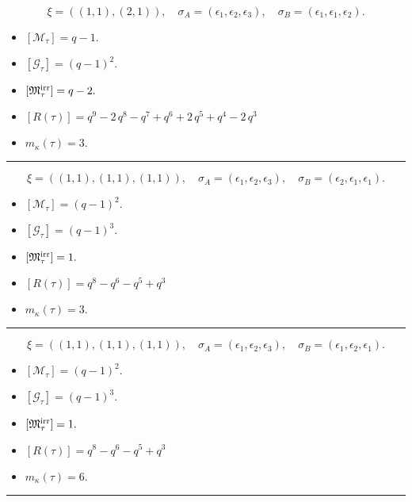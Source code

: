 \documentclass[10pt,a4paper]{amsart}
\begin{document}
$$\xi = ({(1, 1)}, {(2, 1)}),\quad \sigma_A = ({{\epsilon_1}}, {{\epsilon_2, \epsilon_3}}),\quad \sigma_B = ({{\epsilon_1}}, {{\epsilon_1, \epsilon_2}}).$$

\begin{itemize}
 \item $[\mathcal{M}_{\tau}] = q - 1 .$

 \item $[\mathcal{G}_{\tau}] = {\left(q - 1\right)}^{2} .$

 \item $[{\frak M}_{\tau}^{\textrm{irr}}] = q - 2 .$

 \item $[R(\tau)] = q^{9} - 2 \, q^{8} - q^{7} + q^{6} + 2 \, q^{5} + q^{4} - 2 \, q^{3} $

 \item $m_{\kappa}(\tau) = 3 .$

 \end{itemize}
\noindent\rule{8cm}{0.4pt}

$$\xi = ({(1, 1)}, {(1, 1), (1, 1)}),\quad \sigma_A = ({{\epsilon_1}}, {{\epsilon_2}, {\epsilon_3}}),\quad \sigma_B = ({{\epsilon_2}}, {{\epsilon_1}, {\epsilon_1}}).$$

\begin{itemize}
 \item $[\mathcal{M}_{\tau}] = {\left(q - 1\right)}^{2} .$

 \item $[\mathcal{G}_{\tau}] = {\left(q - 1\right)}^{3} .$

 \item $[{\frak M}_{\tau}^{\textrm{irr}}] = 1 .$

 \item $[R(\tau)] = q^{8} - q^{6} - q^{5} + q^{3} $

 \item $m_{\kappa}(\tau) = 3 .$

 \end{itemize}
\noindent\rule{8cm}{0.4pt}

$$\xi = ({(1, 1)}, {(1, 1)}, {(1, 1)}),\quad \sigma_A = ({{\epsilon_1}}, {{\epsilon_2}}, {{\epsilon_3}}),\quad \sigma_B = ({{\epsilon_1}}, {{\epsilon_2}}, {{\epsilon_1}}).$$

\begin{itemize}
 \item $[\mathcal{M}_{\tau}] = {\left(q - 1\right)}^{2} .$

 \item $[\mathcal{G}_{\tau}] = {\left(q - 1\right)}^{3} .$

 \item $[{\frak M}_{\tau}^{\textrm{irr}}] = 1 .$

 \item $[R(\tau)] = q^{8} - q^{6} - q^{5} + q^{3} $

 \item $m_{\kappa}(\tau) = 6 .$

 \end{itemize}
\noindent\rule{9cm}{2pt}\vspace{0.2cm}
\end{document}
